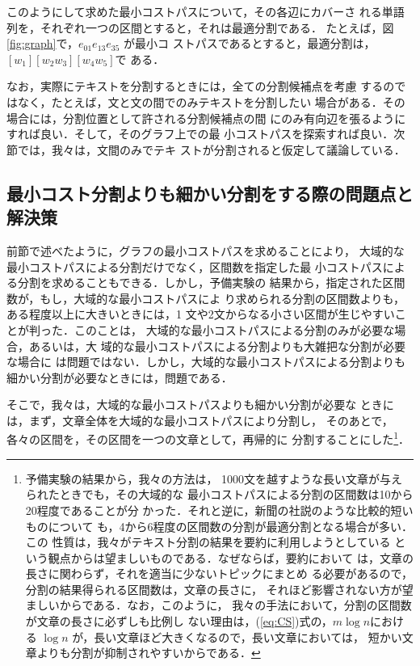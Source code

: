 このようにして求めた最小コストパスについて，その各辺にカバーさ
れる単語列を，それぞれ一つの区間とすると，それは最適分割である．
たとえば，図\ref{fig:graph}で，$e_{01} e_{13} e_{35}$ が最小コ
ストパスであるとすると，最適分割は，$[w_1][w_2 w_3][w_4 w_5]$で
ある．

なお，実際にテキストを分割するときには，全ての分割候補点を考慮
するのではなく，たとえば，文と文の間でのみテキストを分割したい
場合がある．その場合には，分割位置として許される分割候補点の間
にのみ有向辺を張るようにすれば良い．そして，そのグラフ上での最
小コストパスを探索すれば良い．次節では，我々は，文間のみでテキ
ストが分割されると仮定して議論している．

\subsection{最小コスト分割よりも細かい分割をする際の問題点と解決策}
\label{eq:rec}

前節で述べたように，グラフの最小コストパスを求めることにより，
大域的な最小コストパスによる分割だけでなく，区間数を指定した最
小コストパスによる分割を求めることもできる．しかし，予備実験の
結果から，指定された区間数が，もし，大域的な最小コストパスによ
り求められる分割の区間数よりも，ある程度以上に大きいときには，1
文や2文からなる小さい区間が生じやすいことが判った．このことは，
大域的な最小コストパスによる分割のみが必要な場合，あるいは，大
域的な最小コストパスによる分割よりも大雑把な分割が必要な場合に
は問題ではない．しかし，大域的な最小コストパスによる分割よりも
細かい分割が必要なときには，問題である．

そこで，我々は，大域的な最小コストパスよりも細かい分割が必要な
ときには，まず，文章全体を大域的な最小コストパスにより分割し，
そのあとで，各々の区間を，その区間を一つの文章として，再帰的に
分割することにした\footnote{予備実験の結果から，我々の方法は，
  1000文を越すような長い文章が与えられたときでも，その大域的な
  最小コストパスによる分割の区間数は10から20程度であることが分
  かった．それと逆に，新聞の社説のような比較的短いものについて
  も，4から6程度の区間数の分割が最適分割となる場合が多い．この
  性質は，我々がテキスト分割の結果を要約に利用しようとしている
  という観点からは望ましいものである．なぜならば，要約において
  は，文章の長さに関わらず，それを適当に少ないトピックにまとめ
  る必要があるので，分割の結果得られる区間数は，文章の長さに，
  それほど影響されない方が望ましいからである．なお，このように，
  我々の手法において，分割の区間数が文章の長さに必ずしも比例し
  ない理由は，(\ref{eq:CS})式の，$m \log n$における 
  $\log n$ が，長い文章ほど大きくなるので，長い文章においては，
  短かい文章よりも分割が抑制されやすいからである．
}．

